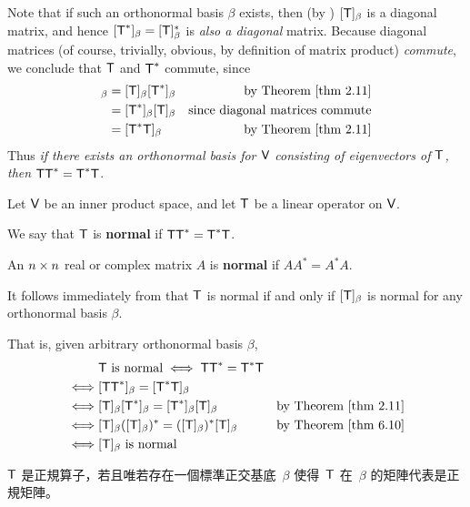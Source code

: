 \begin{remark} \label{remark 6.4.1}
Note that if such an orthonormal basis \(\beta\) exists, then (by ) \([\textsf{T}]_{\beta}\) is a diagonal matrix, and hence \([\textsf{T}^*]_{\beta} = [\textsf{T}]^*_{\beta}\) is \emph{also a diagonal} matrix.
Because diagonal matrices (of course, trivially, obvious, by definition of matrix product) \emph{commute}, we conclude that \(\textsf{T}\) and \(\textsf{T}^*\) commute, since
\begin{align*}
    [\T\T^*]_{\beta} & = [\T]_{\beta}[\T^*]_{\beta} & \text{by \THM{2.11}} \\
        & = [\T^*]_{\beta}[\T]_{\beta} & \text{since diagonal matrices commute} \\
        & = [\T^*\T]_{\beta} & \text{by \THM{2.11}}
\end{align*}
Thus \emph{if there exists an orthonormal basis for \(\textsf{V}\) consisting of eigenvectors of \(\textsf{T}\), then \(\textsf{T}\textsf{T}^* = \textsf{T}^*\textsf{T}\)}.
\end{remark}

\begin{definition} \label{def 6.8}
Let \(\textsf{V}\) be an inner product space, and let \(\textsf{T}\) be a linear operator on \(\textsf{V}\).

 We say that \(\textsf{T}\) is \textbf{normal} if \(\textsf{T}\textsf{T}^* = \textsf{T}^*\textsf{T}\).

 An \(n \times n\) real or complex matrix \(A\) is \textbf{normal} if \(AA^* = A^*A\).
\end{definition}

\begin{remark} \label{remark 6.4.2}
It follows immediately from  that \(\textsf{T}\) is normal if and only if \([\textsf{T}]_{\beta}\) is normal for any orthonormal basis \(\beta\).

That is, given arbitrary orthonormal basis \(\beta\),
\begin{align*}
    & \T \text{ is normal} \iff \T\T^* = \T^*\T \\
    \iff & [\T\T^*]_{\beta} = [\T^*\T]_{\beta} \\
    \iff & [\T]_{\beta} [\T^*]_{\beta} = [\T^*]_{\beta} [\T]_{\beta} & \text{by \THM{2.11}} \\
    \iff & [\T]_{\beta} ([\T]_{\beta})^* = ([\T]_{\beta})^* [\T]_{\beta} & \text{by \THM{6.10}} \\
    \iff & [\T]_{\beta} \text{ is normal}
\end{align*}
\end{remark}

\begin{note}
\(\textsf{T}\) 是正規算子，若且唯若存在一個標準正交基底\ \(\beta\) 使得\ \(\textsf{T}\) 在\ \(\beta\) 的矩陣代表是正規矩陣。
\end{note}

